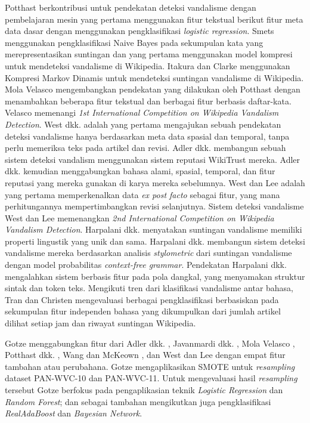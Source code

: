 Potthast \cite{potthast2008automatic} berkontribusi untuk pendekatan deteksi vandalisme dengan pembelajaran mesin yang pertama menggunakan fitur tekstual berikut fitur meta data dasar dengan menggunakan pengklasifikasi \textit{logistic regression}.
Smets \cite{smets08automaticvandalism} menggunakan pengklasifikasi Naive Bayes pada sekumpulan kata yang merepresentasikan suntingan dan yang pertama menggunakan model kompresi untuk mendeteksi vandalisme di Wikipedia.
Itakura dan Clarke \cite{itakura2009using} menggunakan Kompresi Markov Dinamis untuk mendeteksi suntingan vandalisme di Wikipedia.
Mola Velasco \cite{mola2012wikipedia} mengembangkan pendekatan yang dilakukan oleh Potthast \cite{potthast2008automatic} dengan menambahkan beberapa fitur tekstual dan berbagai fitur berbasis daftar-kata.
Velasco memenangi \textit{1st International Competition on Wikipedia Vandalism Detection}.
West dkk. \cite{west2011multilingual} adalah yang pertama mengajukan sebuah pendekatan deteksi vandalisme hanya berdasarkan meta data spasial dan temporal, tanpa perlu memeriksa teks pada artikel dan revisi.
Adler dkk. \cite{adler2010detecting} membangun sebuah sistem deteksi vandalism menggunakan sistem reputasi WikiTrust mereka.
Adler dkk. \cite{adler2011wikipedia} kemudian menggabungkan bahasa alami, spasial, temporal, dan fitur reputasi yang mereka gunakan di karya mereka sebelumnya.
West dan Lee \cite{west2011multilingual} adalah yang pertama memperkenalkan data \textit{ex post facto} sebagai fitur, yang mana perhitungannya mempertimbangkan revisi selanjutnya.
Sistem deteksi vandalisme West dan Lee memenangkan \textit{2nd International Competition on Wikipedia Vandalism Detection}.
Harpalani dkk. \cite{harpalani2011language} menyatakan suntingan vandalisme memiliki properti lingustik yang unik dan sama. Harpalani dkk. membangun sistem deteksi vandalisme mereka berdasarkan analisis \textit{stylometric} dari suntingan vandalisme dengan model probabilitas \textit{context-free grammar}.
Pendekatan Harpalani dkk. mengalahkan sistem berbasis fitur pada pola dangkal, yang menyamakan struktur sintak dan token teks.
Mengikuti tren dari klasifikasi vandalisme antar bahasa, Tran dan Christen \cite{tran2013cross} mengevaluasi berbagai pengklasifikasi berbasiskan pada sekumpulan fitur independen bahasa yang dikumpulkan dari jumlah artikel dilihat setiap jam dan riwayat suntingan Wikipedia.

Gotze \cite{gotze2014advanced} menggabungkan fitur dari Adler dkk. \cite{adler2011wikipedia}, Javanmardi dkk. \cite{javanmardi2011vandalism}, Mola Velasco \cite{mola2012wikipedia}, Potthast dkk. \cite{potthast2008automatic}, Wang dan McKeown \cite{wang2010got}, dan West dan Lee \cite{west2011multilingual} dengan empat fitur tambahan atau perubahana.
Gotze mengaplikasikan SMOTE untuk \textit{resampling} dataset PAN-WVC-10 dan PAN-WVC-11.
Untuk mengevaluasi hasil \textit{resampling} tersebut Gotze berfokus pada pengaplikasian teknik \textit{Logistic Regression} dan \textit{Random Forest};
dan sebagai tambahan mengikutkan juga pengklasifikasi \textit{RealAdaBoost} dan \textit{Bayesian Network}.

